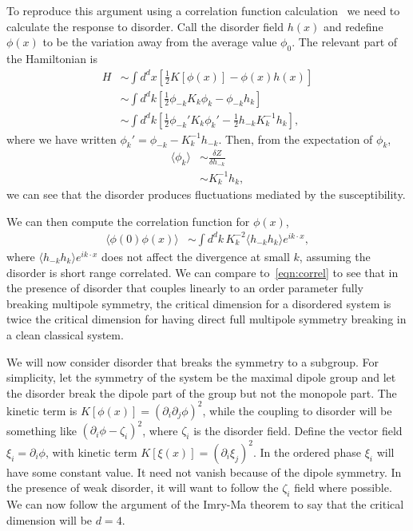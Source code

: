 \documentclass[prb,aps,twocolumn, amsfonts,amsmath,amssymb,nofootinbib,superscriptaddress]{revtex4-2}
\newcommand{\nn}{\nonumber\\}
\newcommand{\half}{\frac{1}{2}}
\begin{document}
To reproduce this argument using a correlation function calculation~\cite{ImryMa} we need to calculate the response to disorder. Call the disorder field $h(x)$ and redefine $\phi(x)$ to be the variation away from the average value $\phi_0$. The relevant part of the Hamiltonian is 
\begin{align}
H &\sim \int d^dx \left[ \half K[ \phi(x)] - \phi(x) h(x) \right] \nn
&\sim \int d^dk \left[ \half \phi_{-k} K_k \phi_k - \phi_{-k} h_k \right] \nn
&\sim \int d^dk \left[ \half \phi_{-k}' K_k \phi_k' - \half h_{-k} K^{-1}_k h_k \right],
\end{align}
where we have written $\phi_k' = \phi_{-k} - K^{-1}_k h_{-k}$. Then, from the expectation of $\phi_k$,
\begin{align}
\langle \phi_k \rangle &\sim \frac{\delta Z}{\delta h_{-k} } \nn
&\sim K_k^{-1} h_{k},
\end{align}
we can see that the disorder produces fluctuations mediated by the susceptibility.

We can then compute the correlation function for $\phi(x)$,
\begin{align}
\langle \phi(0) \phi(x) \rangle &\sim \int d^dk \, K_k^{-2} \langle h_{-k} h_{k} \rangle e^{ik\cdot x},
\end{align}
where $\langle h_{-k} h_{k} \rangle e^{ik\cdot x}$ does not affect the divergence at small $k$, assuming the disorder is short range correlated. We can compare to~\eqref{eqn:correl} to see that in the presence of disorder that couples linearly to an order parameter fully breaking multipole symmetry, the critical dimension for a disordered system is twice the critical dimension for having direct full multipole symmetry breaking in a clean classical system.

We will now consider disorder that breaks the symmetry to a subgroup. For simplicity, let the symmetry of the system be the maximal dipole group and let the disorder break the dipole part of the group but not the monopole part. The kinetic term is $K[\phi(x)]= (\partial_i \partial_j \phi)^2$, while the coupling to disorder will be something like $(\partial_i\phi - \zeta_i)^2$, where $\zeta_i$ is the disorder field. 
Define the vector field $\xi_i = \partial_i\phi$, with kinetic term $K[\xi(x)]= (\partial_i \xi_j)^2$. In the ordered phase $\xi_i$ will have some constant value. It need not vanish because of the dipole symmetry. In the presence of weak disorder, it will want to follow the $\zeta_i$ field where possible. We can now follow the argument of the Imry-Ma theorem to say that the critical dimension will be $d=4$.
\end{document}
